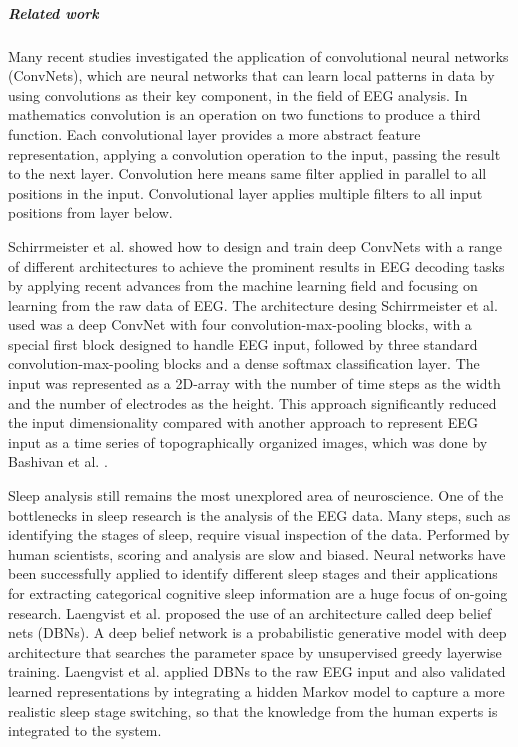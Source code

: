 \documentclass{article}
\begin{document}
\subparagraph{Related work} Many recent studies \cite{cecotti, shamwell,driver} investigated the application of convolutional neural networks (ConvNets), which are neural networks that can learn local patterns in data by using convolutions as their key component, in the field of EEG analysis. In mathematics convolution is an operation on two functions to produce a third function. Each convolutional layer provides a more abstract feature representation, applying a convolution operation to the input, passing the result to the next layer. Convolution here means same filter applied in parallel to all positions in the input. Convolutional layer applies multiple filters to all input positions from layer below.

Schirrmeister et al. \cite{schirrmeister} showed how to design and train deep ConvNets with a range of different architectures to achieve the prominent results in EEG decoding tasks by applying recent advances from the machine learning field and focusing on learning from the raw data of EEG. The architecture desing Schirrmeister et al. used was a  deep ConvNet with four convolution-max-pooling blocks, with a special first block designed to handle EEG input, followed by three standard convolution-max-pooling blocks and a dense softmax classification layer. The input was represented as a 2D-array with the number of time steps as the width and the number of electrodes as the height. This approach significantly reduced the input dimensionality compared with another approach to represent EEG input as a time series of topographically organized images, which was done by Bashivan et al. \cite{learning_eeg_repr}.

Sleep analysis still remains the most unexplored area of neuroscience. One of the bottlenecks in sleep research is the analysis of the EEG data. Many steps, such as identifying the stages of sleep, require visual inspection of the data. Performed by human scientists, scoring and analysis are slow and biased. Neural networks have been successfully applied to identify different sleep stages and their applications for extracting categorical cognitive sleep information are a huge focus of on-going research. Laengvist et al. \cite{sleep} proposed the use of an architecture called deep belief nets (DBNs). A deep belief network is a probabilistic generative model with deep architecture that searches the parameter space by unsupervised greedy layerwise training. Laengvist et al. applied DBNs to the raw EEG input and also validated learned representations by integrating a hidden Markov model to capture a more realistic sleep stage switching, so that the knowledge from the human experts is integrated to the system.
\end{document}
